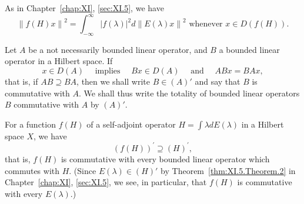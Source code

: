 \begin{example}\label{ex:XI.12.Example.3} As in Chapter~\ref{chap:XI}, \ref{sec:XI.5}, we have 
\begin{equation}\label{eq:XI.12.4}
\left\| f (H) x \right\| ^{2} = \int_{- \infty} ^{\infty} | f (\lambda) | ^{2} d \left\| E (\lambda) x \right\| ^{2} \text{ whenever } x \in D (f (H)).
\end{equation}
\end{example}

\begin{definitionu} Let $A$ be a not necessarily bounded linear operator, and $B$ a bounded linear operator in a Hilbert space. If 
\begin{equation}\label{eq:XI.12.5}
x \in D (A) \quad \text{ implies } \quad B x \in D (A) \quad \text{ and } \quad A B x = B A x,
\end{equation}
that is, if $AB \supseteq BA$, then we shall write $B \in (A)'$ and say that $B$ is commutative with $A$. We shall thus write the totality of bounded linear operators $B$ commutative with $A$ by $(A)'$. 
\end{definitionu}

\begin{theorem}\label{thm:XI.12.Theorem.1} For a function $f(H)$ of a self-adjoint operator $H = \int \lambda dE(\lambda)$ in a Hilbert space $X$, we have 
\begin{equation}\label{eq:XI.12.6}
(f (H)) ^{\prime} \supseteq (H) ^{\prime},
\end{equation}
that is, $f(H)$ is commutative with every bounded linear operator which commutes with $H$. (Since $E(\lambda) \in (H)'$ by Theorem~\ref{thm:XI.5.Theorem.2} in Chapter~\ref{chap:XI}, \ref{sec:XI.5}, we see, in particular, that $f(H)$ is commutative with every $E(\lambda)$.) 
\end{theorem}

